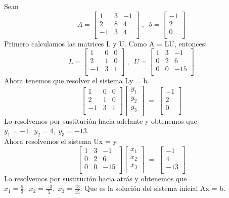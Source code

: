 \begin{ejemplo}
Sean
\[ A = \begin{bmatrix}
1 & 3 & -1 \\
2 & 8 & 4 \\
-1 & 3 & 4 \\
\end{bmatrix}
\; , \; \;
b = \begin{bmatrix}
-1 \\
2 \\
0 \\
\end{bmatrix}
\]
Primero calculamos las matrices L y U. Como A = LU, entonces:
\[ L = \begin{bmatrix}
1 & 0 & 0 \\
2 & 1 & 0 \\
-1 & 3 & 1 \\
\end{bmatrix}
\; , \; \;
U = \begin{bmatrix}
1 & 3 & -1 \\
0 & 2 & 6 \\
0 & 0 & -15 \\
\end{bmatrix}
\]
Ahora tenemos que resolver el sistema Ly = b.
\[ \begin{bmatrix}
1 & 0 & 0 \\
2 & 1 & 0 \\
-1 & 3 & 1 \\
\end{bmatrix}
\begin{bmatrix}
y_1 \\
y_2 \\
y_3 \\
\end{bmatrix}
\; = \;
\begin{bmatrix}
-1 \\
2 \\
0 \\
\end{bmatrix}
\]
Lo resolvemos por sustitución hacia adelante y obtenemos que $y_1 = -1, \; y_2 = 4, \; y_3 = -13$.\\
Ahora resolvemos el sistema Ux = y.
\[
\begin{bmatrix}
1 & 3 & -1 \\
0 & 2 & 6 \\
0 & 0 & -15 \\
\end{bmatrix}
\begin{bmatrix}
x_1 \\
x_2 \\
x_3 \\
\end{bmatrix}
\; = \;
\begin{bmatrix}
-1 \\
4 \\
-13 \\
\end{bmatrix}
\]
Lo resolvemos por sustitución hacia atrás y obtenemos que $x_1 = \frac{5}{3}, \; x_2 = \frac{-3}{5}, \; x_3 = \frac{13}{15}$. Que es la solución del sistema inicial Ax = b.
\end{ejemplo}

